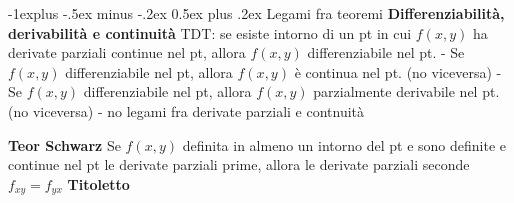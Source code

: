 \documentclass[10pt,landscape]{article}
\makeatletter
\renewcommand{\subsection}{\@startsection{subsection}{2}{0mm}%
                                {-1explus -.5ex minus -.2ex}%
                                {0.5ex plus .2ex}%
                                {\normalfont\normalsize\bfseries}}
\makeatother
\begin{document}
\begin{multicols*}{5}
\subsection {Legami fra teoremi }
\textbf{Differenziabilit\`a,  derivabilit\`a e continuit\`a}\newline
TDT: se esiste intorno di un pt in cui $f(x,y)$ ha derivate parziali continue nel pt, allora $f(x,y)$  differenziabile nel pt. \newline
- Se $f(x,y)$ differenziabile nel pt, allora $f(x,y)$ è continua nel pt. (no viceversa) \newline
- Se $f(x,y)$ differenziabile nel pt, allora $f(x,y)$ parzialmente derivabile nel pt. (no viceversa) \newline
- no legami fra derivate parziali e contnuit\`a

\textbf{Teor Schwarz}\newline
Se $f(x,y)$ definita in almeno un intorno del pt e sono definite e continue nel pt le derivate parziali prime, allora le derivate parziali seconde $f_{xy}=f_{yx}$ \newline
\textbf{Titoletto}\newline


\end{multicols*}
\end{document}
